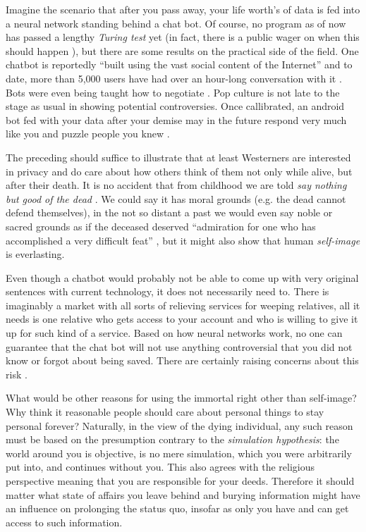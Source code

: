 Imagine the scenario that after you pass away, your life worth's of data is fed into a neural network standing behind a chat bot. Of course, no program as of now has passed a lengthy \textit{Turing test} yet (in fact, there is a public wager on when this should happen \cite{longbet}), but there are some results on the practical side of the field.
One chatbot is reportedly ``built using the vast social content of the Internet'' and to date, more than 5,000 users have had over an hour-long conversation with it \cite{microsoft}. Bots were even being taught how to negotiate \cite{fbbots}.
Pop culture is not late to the stage as usual in showing potential controversies. Once callibrated, an android bot fed with your data after your demise may in the future respond very much like you and puzzle people you knew \cite{blackmirror}.

\medskip
The preceding should suffice to illustrate that at least Westerners are interested in privacy and do care about how others think of them not only while alive, but after their death. It is no accident that from childhood we are told \textit{say nothing but good of the dead} \cite{collins}.
We could say it has moral grounds (e.g. the dead cannot defend themselves), in the not so distant a past we would even say noble or sacred grounds as if the deceased deserved ``admiration for one who has accomplished a very difficult feat'' \cite{freud}, but it might also show that human \emph{self-image} is everlasting.

Even though a chatbot would probably not be able to come up with very original sentences with current technology, it does not necessarily need to.
There is imaginably a market with all sorts of relieving services for weeping relatives, all it needs is one relative who gets access to your account and who is willing to give it up for such kind of a service.
Based on how neural networks work, no one can guarantee that the chat bot will not use anything controversial that you did not know or forgot about being saved. There are certainly raising concerns about this risk \cite{angstrom}.

What would be other reasons for using the immortal right other than self-image? Why think it reasonable people should care about personal things to stay personal forever? Naturally, in the view of the dying individual, any such reason must be based on the presumption contrary to the \textit{simulation hypothesis}: \cite{bostrom} the world around you is objective, is no mere simulation, which you were arbitrarily put into, and continues without you. This also agrees with the religious perspective meaning that you are responsible for your deeds.
Therefore it should matter what state of affairs you leave behind and burying information might have an influence on prolonging the status quo, insofar as only you have and can get access to such information.

